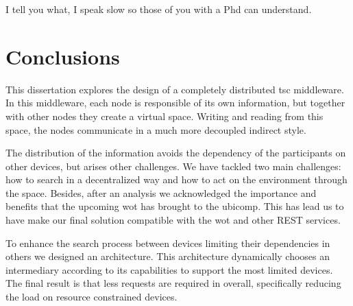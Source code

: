 

\begin{savequote}[50mm]
I tell you what, I speak slow so those of you with a Phd can understand.
\end{savequote}


\chapter{Conclusions}
\label{cha:conclusions}
\newcommand{\pathchapseven}{7_conclusion}


\ifpdf
    \graphicspath{{\pathchapseven/figures/PNG/}{\pathchapseven/figures/PDF/}{\pathchapseven/figures/}}
\else
    \graphicspath{{\pathchapseven/figures/EPS/}{\pathchapseven/figures/}}
\fi




This dissertation explores the design of a completely distributed \ac{tsc} middleware.
In this middleware, each node is responsible of its own information, but together with other nodes they create a virtual space. %
Writing and reading from this space, the nodes communicate in a much more decoupled indirect style.

The distribution of the information avoids the dependency of the participants on other devices, but arises other challenges.
We have tackled two main challenges: how to search in a decentralized way and how to act on the environment through the space.
Besides, after an analysis we acknowledged the importance and benefits that the upcoming \ac{wot} has brought to the \acl{ubicomp}.
This has lead us to have make our final solution compatible with the \ac{wot} and other REST services.

To enhance the search process between devices limiting their dependencies in others we designed an architecture.
This architecture dynamically chooses an intermediary according to its capabilities to support the most limited devices.
The final result is that less requests are required in overall, specifically reducing the load on resource constrained devices.


